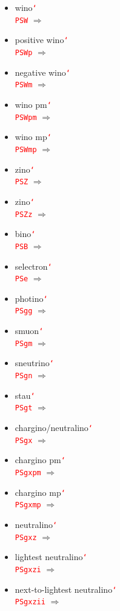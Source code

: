 \documentclass[12pt]{article}
\newcommand{\texcmd}[1]{\textcolor{red}{\texttt{\char`\\#1}}}
\begin{document}
\begin{multicols}{2}
{\begin{itemize}
\item wino\newline \texcmd{PSW} $\Rightarrow$ \PSW
\item positive wino\newline \texcmd{PSWp} $\Rightarrow$ \PSWp
\item negative wino\newline \texcmd{PSWm} $\Rightarrow$ \PSWm
\item wino pm\newline \texcmd{PSWpm} $\Rightarrow$ \PSWpm
\item wino mp\newline \texcmd{PSWmp} $\Rightarrow$ \PSWmp
\item zino\newline \texcmd{PSZ} $\Rightarrow$ \PSZ
\item zino\newline \texcmd{PSZz} $\Rightarrow$ \PSZz
\item bino\newline \texcmd{PSB} $\Rightarrow$ \PSB
\item selectron\newline \texcmd{PSe} $\Rightarrow$ \PSe
\item photino\newline \texcmd{PSgg} $\Rightarrow$ \PSgg
\item smuon\newline \texcmd{PSgm} $\Rightarrow$ \PSgm
\item sneutrino\newline \texcmd{PSgn} $\Rightarrow$ \PSgn
\item stau\newline \texcmd{PSgt} $\Rightarrow$ \PSgt
\item chargino/neutralino\newline \texcmd{PSgx} $\Rightarrow$ \PSgx
\item chargino pm\newline \texcmd{PSgxpm} $\Rightarrow$ \PSgxpm
\item chargino mp\newline \texcmd{PSgxmp} $\Rightarrow$ \PSgxmp
\item neutralino\newline \texcmd{PSgxz} $\Rightarrow$ \PSgxz
\item lightest neutralino\newline \texcmd{PSgxzi} $\Rightarrow$ \PSgxzi
\item next-to-lightest neutralino\newline \texcmd{PSgxzii} $\Rightarrow$ \PSgxzii

\end{itemize}}
\end{multicols}
\end{document}
